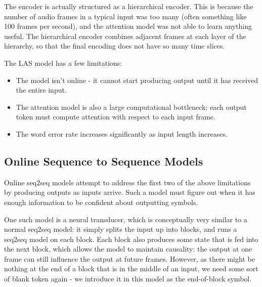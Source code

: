 The encoder is actually structured as a hierarchical encoder. This is because the number of audio frames in a typical input was too many (often something like 100 frames per second), and the attention model was not able to learn anything useful. The hierarchical encoder combines adjacent frames at each layer of the hierarchy, so that the final encoding does not have so many time slices.

The LAS model has a few limitations:
\begin{itemize}
\item The model isn't online - it cannot start producing output until it has received the entire input.
\item The attention model is also a large computational bottleneck: each output token must compute attention with respect to each input frame.
\item The word error rate increases significantly as input length increases.
\end{itemize}

\subsection{Online Sequence to Sequence Models}

Online seq2seq models attempt to address the first two of the above limitations by producing outputs as inputs arrive. Such a model must figure out when it has enough information to be confident about outputting symbols. 

One such model is a neural transducer, which is conceptually very similar to a normal seq2seq model: it simply splits the input up into blocks, and runs a seq2seq model on each block. Each block also produces some state that is fed into the next block, which allows the model to maintain causality: the output at one frame can still influence the output at future frames. However, as there might be nothing at the end of a block that is in the middle of an input, we need some sort of blank token again - we introduce it in this model as the end-of-block symbol.

